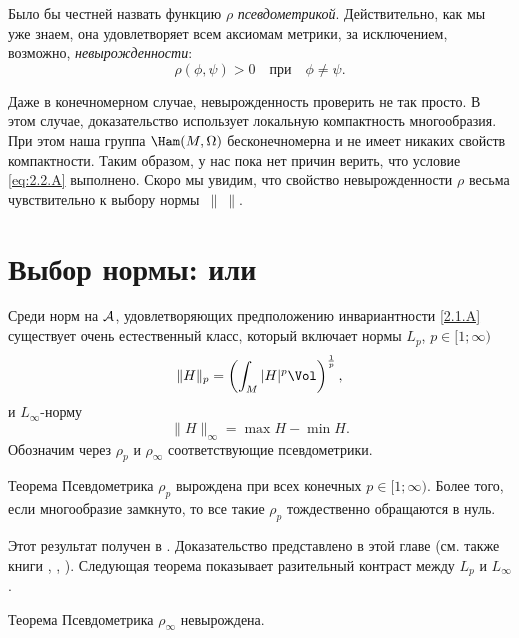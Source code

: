 Было бы честней назвать функцию $\rho$ \emph{псевдометрикой}.
Действительно, как мы уже знаем, она удовлетворяет всем аксиомам метрики, за исключением, возможно, {}\emph{невырожденности}: 
\begin{equation}
\rho (\phi, \psi)> 0
\quad\text{при}\quad
\phi \ne \psi.
\label{eq:2.2.A}
\end{equation}

Даже в конечномерном случае, невырожденность проверить не так просто.
В этом случае, доказательство использует локальную компактность многообразия.
При этом наша группа $\Ham (M, \Omega)$ бесконечномерна и не имеет никаких свойств компактности.
Таким образом, у нас пока нет причин верить, что условие \ref{eq:2.2.A} выполнено.
Скоро мы увидим, что свойство невырожденности $\rho$ весьма чувствительно к выбору нормы~$\|\ \|$.

\section[\texorpdfstring{Выбор нормы: $L_p$ или $L_\infty$}{Выбор нормы: Lₚ или L∞}]{Выбор нормы:  или }

Среди норм на $\mathcal{A}$, удовлетворяющих предположению инвариантности
\ref{2.1.A} существует очень естественный класс, который включает
нормы $L_p$, $p \in [1;\infty)$
\[\|H\|_p=\left(\int_M|H|^p\Vol\right)^{\frac1p},\]
и $L_\infty$-норму 
\[\|H\|_\infty = \max H - \min H.\]
Обозначим через $\rho_p$ и $\rho_\infty$ соответствующие псевдометрики.

\begin{thm}{Теорема}\label{2.3.A}
Псевдометрика $\rho_p$ вырождена при всех конечных $p \in [1;\infty)$.
Более того, если многообразие замкнуто, то все такие $\rho_p$ тождественно обращаются в нуль.
\end{thm}

Этот результат получен в \cite{EP}.
Доказательство представлено в этой главе (см. также книги \cite{HZ}, \cite{MS}, \cite{AK}).
Следующая теорема показывает разительный контраст между $L_p$ и $L_\infty$.

\begin{thm}{Теорема}\label{2.3.B}
Псевдометрика $\rho_\infty$ невырождена.
\end{thm}

